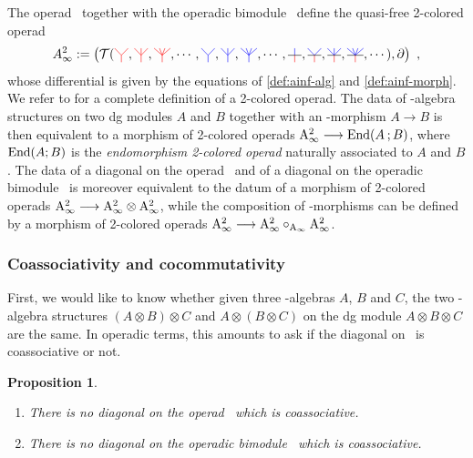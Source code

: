 \documentclass[twoside, 11pt]{amsart}
\newtheorem{proposition}[definition]{Proposition}
\theoremstyle{remark}
\begin{document}
The operad \Ainf\ together with the operadic bimodule \Minf\ define the quasi-free 2-colored operad 
\[ A_\infty^2 := \left( \mathcal{T} (\arbreopdeuxcol{red} , \arbreoptroiscol{red} , \arbreopquatrecol{red}, \cdots, \arbreopdeuxcol{blue} , \arbreoptroiscol{blue} , \arbreopquatrecol{blue} , \cdots, \arbreopunmorph , \arbreopdeuxmorph , \arbreoptroismorph , \arbreopquatremorph , \cdots )  , \partial \right) \ , \]
whose differential is given by the equations of \cref{def:ainf-alg} and \cref{def:ainf-morph}.
We refer to \cite[Section 11]{yau-colored} for a complete definition of a 2-colored operad.
The data of \Ainf -algebra structures on two dg modules $A$ and $B$ together with an \Ainf -morphism $A \rightarrow B$ is then equivalent to a morphism of 2-colored operads $\mathrm{A}_\infty^2 \longrightarrow \mathrm{End} ( A \text{\hspace{2pt}} ; B) $, where $\mathrm{End} ( A ; B)$ is the \textit{endomorphism 2-colored operad} naturally associated to $A$ and $B$.
The data of a diagonal on the operad \Ainf\ and of a diagonal on the operadic bimodule \Minf\ is moreover equivalent to the datum of a morphism of 2-colored operads $\mathrm{A}_\infty^2 \longrightarrow \mathrm{A}_\infty^2 \otimes \mathrm{A}_\infty^2$, while the composition of \Ainf -morphisms can be defined by a morphism of 2-colored operads $\mathrm{A}_\infty^2 \longrightarrow \mathrm{A}_\infty^2 \circ_{\mathrm{A}_\infty} \mathrm{A}_\infty^2 $.


\subsubsection{Coassociativity and cocommutativity} \label{sss:coassoc-cocomm}

First, we would like to know whether given three \Ainf -algebras $A$, $B$ and $C$, the two \Ainf -algebra structures $( A \otimes B) \otimes C$ and $A \otimes ( B \otimes C)$ on the dg module $A \otimes B \otimes C$ are the same. 
In operadic terms, this amounts to ask if the diagonal on \Ainf\ is coassociative or not.

\begin{proposition} \label{prop:pas-coassoc}
  \label{prop:nocoassoc}
  \begin{enumerate}[leftmargin=*]
  \item There is no diagonal on the operad \Ainf\ which is coassociative. 
  \item There is no diagonal on the operadic bimodule \Minf\ which is coassociative.
  \end{enumerate}
\end{proposition} 
\end{document}
